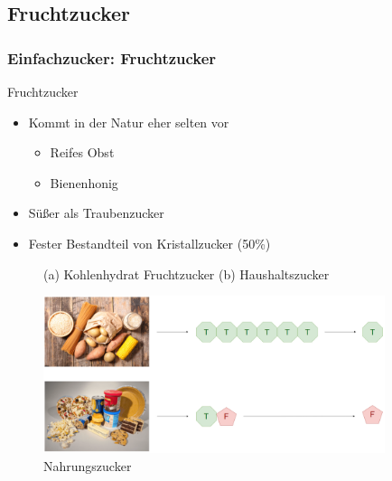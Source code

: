 \documentclass[xcolor=dvipsnames]{beamer}
\begin{document}
    \subsection{Fruchtzucker}
    \begin{frame}[allowframebreaks]
        \frametitle{Einfachzucker: Fruchtzucker}

        \begin{block}{Fruchtzucker}
            \begin{itemize}
                \setlength\itemsep{1em}
                \item Kommt in der Natur eher selten vor
                \begin{itemize}
                    \item Reifes Obst
                    \item Bienenhonig
                \end{itemize}
                \item Süßer als Traubenzucker
                \item Fester Bestandteil von Kristallzucker (50\%)
            \end{itemize}
        \end{block}

        \begin{figure}
            \centering
            \caption{(a) Kohlenhydrat Fruchtzucker (b) Haushaltszucker}
        \end{figure}

        \framebreak

        \begin{figure}
            \centering
            \includegraphics[width=10cm]{../images/t_f.png}
            \caption{Nahrungszucker}
        \end{figure}
    \end{frame}
\end{document}
